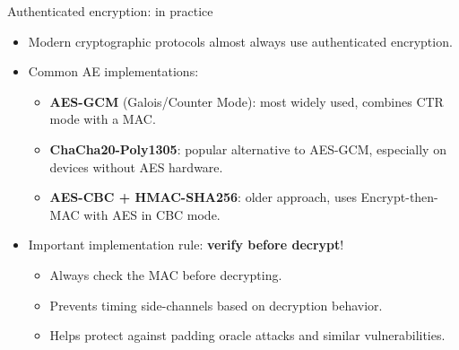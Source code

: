 \ifdefined\PRESENTATION\else\PassOptionsToClass{handout}{beamer}\fi\documentclass[aspectratio=169, lualatex]{beamer}
\begin{document}
\begin{frame}{Authenticated encryption: in practice}
	\begin{itemize}[<+->]
		\item Modern cryptographic protocols almost always use authenticated encryption.
		\item Common AE implementations:
		      \begin{itemize}
			      \item \textbf{AES-GCM} (Galois/Counter Mode): most widely used, combines CTR mode with a MAC.
			      \item \textbf{ChaCha20-Poly1305}: popular alternative to AES-GCM, especially on devices without AES hardware.
			      \item \textbf{AES-CBC + HMAC-SHA256}: older approach, uses Encrypt-then-MAC with AES in CBC mode.
		      \end{itemize}
		\item Important implementation rule: \textbf{verify before decrypt}!
		      \begin{itemize}
			      \item Always check the MAC before decrypting.
			      \item Prevents timing side-channels based on decryption behavior.
			      \item Helps protect against padding oracle attacks and similar vulnerabilities.
		      \end{itemize}
	\end{itemize}
\end{frame}
\end{document}
